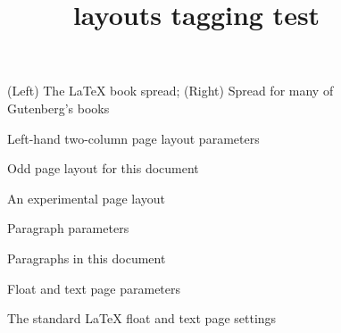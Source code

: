 \documentclass{article}
\title{layouts tagging test}
\begin{document}
\newlength{\pwlayi}
\setlength{\pwlayi}{0.4375\textwidth}
\newlength{\pwlayii}
\setlength{\pwlayii}{0.5\pwlayi}
\begin{figure}
\centering
\begin{minipage}[b]{\pwlayi}
\end{minipage}
\hfill
\begin{minipage}[b]{\pwlayi}
\end{minipage}
\caption{(Left) The \LaTeX{} book spread;
(Right) Spread for many of Gutenberg’s books}
\label{fig:spread}
\end{figure}

\begin{figure}
\oddpagelayoutfalse
\twocolumnlayouttrue
\pagediagram
\caption{Left-hand two-column page layout parameters} \label{fig:pplt}
\end{figure}

\begin{figure}
\currentpage
\oddpagelayouttrue
\pagedesign
\caption{Odd page layout for this document} \label{fig:ptrs}
\end{figure}

\begin{figure}
\currentpage
\trypaperwidth{11in}
\trypaperheight{8.5in}
\trytextwidth{500pt}
\trycolumnsep{40pt}
\trycolumnseprule{3pt}
\tryhoffset{-0.5in}
\tryvoffset{0.5in}
\printheadingsfalse
\drawdimensionstrue
\twocolumnlayouttrue
\pagedesign
\caption{An experimental page layout}\label{fig:pudf}
\end{figure}

\pagevalues

\begin{figure}
\paragraphdiagram
\caption{Paragraph parameters}\label{fig:fpara}
\end{figure}

\kant[3]
\currentparagraph
\begin{figure}
\paragraphdesign
\caption{Paragraphs in this document}\label{fig:dpara}
\end{figure}

\begin{figure}
\floatpagediagram
\caption{Float and text page parameters}\label{fig:fpp}
\end{figure}

\begin{figure}
\currentfloatpage
{}
\floatpagedesign
\caption{The standard \LaTeX{} float and text page settings}
\label{fig:fpstd}
\end{figure}
\end{document}
